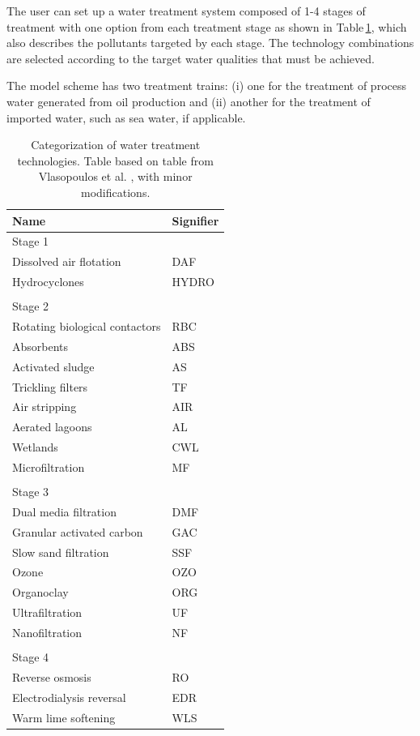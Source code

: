 \documentclass[11pt]{report}
\begin{document}
The user can set up a water treatment system composed of 1-4 stages of treatment with one option from each treatment stage as shown in Table\,\ref{tab:stages}, which also describes the pollutants targeted by each stage. The technology combinations are selected according to the target water qualities that must be achieved.

The model scheme has two treatment trains: (i) one for the treatment of process water generated from oil production and (ii) another for the treatment of imported water, such as sea water, if applicable. 

\begin{table}
\begin{scriptsize}
\caption{Categorization of water treatment technologies. Table based on table from Vlasopoulos et al. \cite{Vlasopoulos2006}, with minor modifications.}
\label{tab:stages}
\begin{tabular*}{0.75\columnwidth}{p{}p{}}
\toprule
Name & Signifier \\
\midrule
Stage 1 & \\
\midrule
Dissolved air flotation & DAF \\
Hydrocyclones & HYDRO \\ 
& \\
Stage 2 & \\
\midrule
Rotating biological contactors & RBC \\
Absorbents & ABS \\ 
Activated sludge & AS \\
Trickling filters & TF \\
Air stripping & AIR \\
Aerated lagoons & AL \\
Wetlands & CWL \\ 
Microfiltration & MF \\
& \\
Stage 3 & \\
\midrule
Dual media filtration & DMF \\ 
Granular activated carbon & GAC \\
Slow sand filtration & SSF \\
Ozone & OZO \\ 
Organoclay & ORG \\ 
Ultrafiltration & UF\\ 
Nanofiltration & NF \\ 
& \\
Stage 4 & \\ 
\midrule
Reverse osmosis & RO \\ 
Electrodialysis reversal & EDR \\ 
Warm lime softening & WLS \\
\bottomrule
\end{tabular*}
\end{scriptsize}
\end{table}
\end{document}
